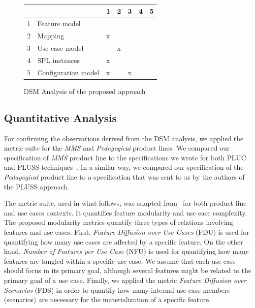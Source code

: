 \documentclass{report}
\begin{document}
\begin{frontmatter}
{\begin{figure}[h]
\centering
\begin{small}
\begin{tabular}{lllllll} \hline
& & 1 & 2 & 3 & 4 & 5 \\ \hline
1 & Feature model 		& 	& 	&      &  	&  	\\ 
2 & Mapping	 		& x	&	&	&	&  	\\
3 & Use case model 	&  	&  x	&  	&  	& 	\\
4 & SPL instances 		& x 	& 	& 	&   	& 	\\
5 & Configuration model 	& x 	&  	&  x	&  	& 	\\  \hline
\end{tabular}
\end{small}
\nocaptionrule \caption{DSM Analysis of the proposed approach}
\label{dsm:cc}
\end{figure}   

\subsection{Quantitative Analysis}

For confirming the observations derived from the DSM analysis, we applied the metric suite for 
the \emph{MMS} and \emph{Pedagogical} product lines. We compared our specification of \emph{MMS} product line to the specifications we wrote for both PLUC and PLUSS techniques~\cite{spg-url}.  
In a similar way, we compared our specification of the \emph{Pedagogical} product line 
to a specification that was sent to us by the authors of the PLUSS approach. 

The metric suite, used in what follows, was adapted from~\cite{garcia-taosd-2005} for both product line 
and use cases contexts. It quantifies 
feature modularity and use case complexity. The proposed modularity 
metrics quantify three types of relations involving features and use cases.
First, \emph{Feature Diffusion over Use Cases} (FDU) is used for
quantifying how many use cases are affected by a specific
feature. On the other hand, \emph{Number of Features per Use Case} (NFU) is used for quantifying
how many features are tangled within a specific use
case. We assume that each use case should focus in
its primary goal, although several features might be related
to the primary goal of a use case. Finally, we applied
the metric \emph{Feature Diffusion over Scenarios} (FDS) in order
to quantify how many internal use case members (scenarios)
are necessary for the materialization of a specific feature.
 
}
\end{frontmatter}
\end{document}
